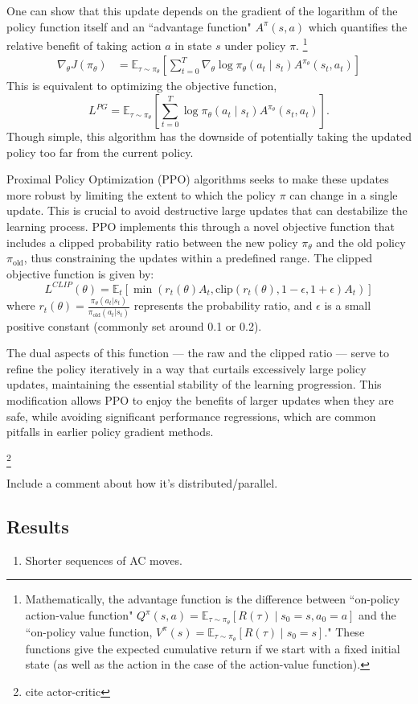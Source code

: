 One can show that this update depends on the gradient of the logarithm of the policy function itself and an ``advantage function" \( A^\pi (s, a) \) which quantifies the relative benefit of taking action \( a \) in state \( s \) under policy \( \pi \).
\footnote{
Mathematically, the advantage function is the difference between ``on-policy action-value function" $Q^{\pi}(s, a) = \mathbb{E}_{\tau \sim \pi_\theta} [R(\tau) \mid s_0 = s, a_0 = a]$ and the ``on-policy value function, $V^{\pi}(s) = \mathbb{E}_{\tau \sim \pi_\theta} [R(\tau) \mid s_0 = s]$." These functions give the expected cumulative return if we start with a fixed initial state (as well as the action in the case of the action-value function).
}
\begin{align*}
	\nabla_\theta J(\pi_\theta) &= \mathbb{E}_{\tau \sim \pi_\theta} \left[ \sum\limits_{t=0}^T \nabla_\theta \log 								\pi_\theta (a_t \mid s_t) A^{\pi_\theta} (s_t, a_t) \right]
\end{align*}
This is equivalent to optimizing the objective function, 
\[
L^{PG} = \mathbb{E}_{\tau \sim \pi_\theta} \left[ \sum\limits_{t=0}^T \log 								\pi_\theta (a_t \mid s_t) A^{\pi_\theta} (s_t, a_t) \right].
\]
Though simple, this algorithm has the downside of potentially taking the updated policy too far from the current policy.

Proximal Policy Optimization (PPO) algorithms seeks to make these updates more robust by limiting the extent to which the policy \( \pi \) can change in a single update. This is crucial to avoid destructive large updates that can destabilize the learning process. PPO implements this through a novel objective function that includes a clipped probability ratio between the new policy \( \pi_\theta \) and the old policy \( \pi_{\text{old}} \), thus constraining the updates within a predefined range. The clipped objective function is given by:
\[
L^{CLIP}(\theta) = \mathbb{E}_t\left[ \min(r_t(\theta) A_t, \text{clip}(r_t(\theta), 1 - \epsilon, 1 + \epsilon) A_t) \right]
\]
where \( r_t(\theta) = \frac{\pi_\theta(a_t | s_t)}{\pi_{\text{old}}(a_t | s_t)} \) represents the probability ratio, and \( \epsilon \) is a small positive constant (commonly set around 0.1 or 0.2).

The dual aspects of this function — the raw and the clipped ratio — serve to refine the policy iteratively in a way that curtails excessively large policy updates, maintaining the essential stability of the learning progression. This modification allows PPO to enjoy the benefits of larger updates when they are safe, while avoiding significant performance regressions, which are common pitfalls in earlier policy gradient methods. 



\footnote{cite actor-critic}

Include a comment about how it's distributed/parallel.

\subsection{Results} \label{sec:results}

\begin{enumerate}
\item Shorter sequences of AC moves. 
\end{enumerate}
